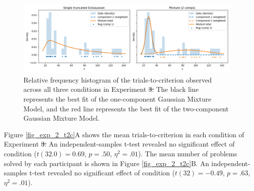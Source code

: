 \documentclass[doc, floatsintext]{apa7}
\providecommand{\DIFadd}[1]{{\protect\color{blue}\uwave{#1}}} %
\providecommand{\DIFdel}[1]{{\protect\color{red}\sout{#1}}}                      %
\providecommand{\DIFaddbegin}{} %
\providecommand{\DIFaddend}{} %
\providecommand{\DIFdelbegin}{} %
\providecommand{\DIFdelend}{} %
\providecommand{\DIFaddFL}[1]{\DIFadd{#1}} %
\providecommand{\DIFdelFL}[1]{\DIFdel{#1}} %
\providecommand{\DIFaddbeginFL}{} %
\providecommand{\DIFaddendFL}{} %
\providecommand{\DIFdelbeginFL}{} %
\providecommand{\DIFdelendFL}{} %
\newcommand{\DIFscaledelfig}{0.5}
\newlength{\DIFdelgraphicswidth} %
\newlength{\DIFdelgraphicsheight} %
\newcommand{\DIFaddincludegraphics}[2][]{{\color{blue}\fbox{\DIFOincludegraphics[#1]{#2}}}} %
\newcommand{\DIFdelincludegraphics}[2][]{%
\sbox{\DIFdelgraphicsbox}{\DIFOincludegraphics[#1]{#2}}%
\settoboxwidth{\DIFdelgraphicswidth}{\DIFdelgraphicsbox} %
\settoboxtotalheight{\DIFdelgraphicsheight}{\DIFdelgraphicsbox} %
\scalebox{\DIFscaledelfig}{%
\parbox[b]{\DIFdelgraphicswidth}{\usebox{\DIFdelgraphicsbox}\\[-\baselineskip] \rule{\DIFdelgraphicswidth}{0em}}\llap{\resizebox{\DIFdelgraphicswidth}{\DIFdelgraphicsheight}{%
\setlength{\unitlength}{\DIFdelgraphicswidth}%
\begin{picture}(1,1)%
\thicklines\linethickness{2pt} %
{\color[rgb]{1,0,0}\put(0,0){\framebox(1,1){}}}%
{\color[rgb]{1,0,0}\put(0,0){\line( 1,1){1}}}%
{\color[rgb]{1,0,0}\put(0,1){\line(1,-1){1}}}%
\end{picture}%
}\hspace*{3pt}}} %
} %
\DeclareRobustCommand{\DIFaddbegin}{\DIFOaddbegin \let\includegraphics\DIFaddincludegraphics} %
\DeclareRobustCommand{\DIFaddend}{\DIFOaddend \let\includegraphics\DIFOincludegraphics} %
\DeclareRobustCommand{\DIFdelbegin}{\DIFOdelbegin \let\includegraphics\DIFdelincludegraphics} %
\DeclareRobustCommand{\DIFdelend}{\DIFOaddend \let\includegraphics\DIFOincludegraphics} %
\DeclareRobustCommand{\DIFaddbeginFL}{\DIFOaddbeginFL \let\includegraphics\DIFaddincludegraphics} %
\DeclareRobustCommand{\DIFaddendFL}{\DIFOaddendFL \let\includegraphics\DIFOincludegraphics} %
\DeclareRobustCommand{\DIFdelbeginFL}{\DIFOdelbeginFL \let\includegraphics\DIFdelincludegraphics} %
\DeclareRobustCommand{\DIFdelendFL}{\DIFOaddendFL \let\includegraphics\DIFOincludegraphics} %
\begin{document}
\begin{figure}
  \centering
  \DIFdelbeginFL %
\DIFdelendFL \DIFaddbeginFL \includegraphics[width=.8\textwidth]{../figures/fig_exp_2_mm_trunc_exgauss_compare.png}
  \DIFaddendFL \caption{
      Relative frequency histogram of the
      trials-to-criterion observed across all three
      conditions in Experiment \DIFdelbeginFL \DIFdelFL{3. }\DIFdelendFL \DIFaddbeginFL \DIFaddFL{2. }\DIFaddendFL The black line represents
      the best fit of the one-component Gaussian Mixture
      Model, and the red line represents the best fit of the
      two-component Gaussian Mixture Model.
}
  \DIFdelbeginFL %
\DIFdelendFL \DIFaddbeginFL \label{fig_mm_hist_2}
\DIFaddendFL \end{figure}

\DIFdelbegin %

\DIFdelend Figure \ref{fig_exp_2_t2c}A shows the mean
trials-to-criterion in each condition of Experiment \DIFdelbegin \DIFdel{3. }\DIFdelend \DIFaddbegin \DIFadd{2. }\DIFaddend An
independent-samples t-test revealed no significant effect of
condition ($t(32.0)=0.69$, $p = .50$, $\eta^2 = .01$).  The
mean number of problems solved by each participant is shown
in Figure \ref{fig_exp_2_t2c}B. An independent-samples
t-test revealed no significant effect of condition ($t(32) =
-0.49$, $p = .63$, $\eta^2 = .01$).

\DIFdelbegin %

\end{document}
